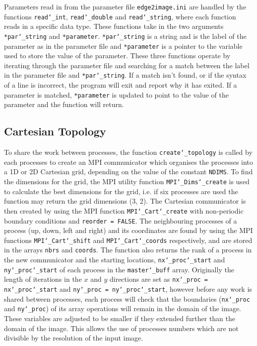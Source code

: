 \documentclass[11pt, a4paper]{article}
\begin{document}
			Parameters read in from the parameter file \texttt{edge2image.ini} are handled by the functions \texttt{read\char`_int}, \texttt{read\char`_double} and \texttt{read\char`_string}, where each function reads in a specific data type. These functions take in the two arguments \texttt{*par\char`_string} and \texttt{*parameter}. \texttt{*par\char`_string} is a string and is the label of the parameter as in the parameter file and \texttt{*parameter} is a pointer to the variable used to store the value of the parameter. These three functions operate by iterating through the parameter file and searching for a match between the label in the parameter file and \texttt{*par\char`_string}. If a match isn't found, or if the syntax of a line is incorrect, the program will exit and report why it has exited. If a parameter is matched, \texttt{*parameter} is updated to point to the value of the parameter and the function will return.
	
		\subsection{Cartesian Topology}
			To share the work between  processes, the function \texttt{create\char`_topology} is called by each processes to create an MPI communicator which organises the processes into a 1D or 2D Cartesian grid, depending on the value of the constant \texttt{NDIMS}. To find the dimensions for the grid, the MPI utility function \texttt{MPI\char`_Dims\char`_create} is used to calculate the best dimensions for the grid, i.e. if six processes are used the function may return the grid dimensions  (3, 2). The Cartesian communicator is then created by using the MPI function \texttt{MPI\char`_Cart\char`_create} with non-periodic boundary conditions and \texttt{reorder = FALSE}. The neighbouring processes of a process (up, down, left and right) and its coordinates are found by using the MPI functions \texttt{MPI\char`_Cart\char`_shift} and \texttt{MPI\char`_Cart\char`_coords} respectively, and are stored in the arrays \texttt{nbrs} and \texttt{coords}. The function also returns the rank of a process in the new communicator and the starting locations, \texttt{nx\char`_proc\char`_start} and \texttt{ny\char`_proc\char`_start} of each process in the \texttt{master\char`_buff} array. Originally the length of iterations in the $x$ and $y$ directions are set as \texttt{nx\char`_proc = nx\char`_proc\char`_start} and \texttt{ny\char`_proc = ny\char`_proc\char`_start}, however before any work is shared between processes, each process will check that the boundaries (\texttt{nx\char`_proc} and \texttt{ny\char`_proc}) of its array operations will remain in the domain of the image. These variables are adjusted to be smaller if they extended further than the domain of the image. This allows the use of processes numbers which are not divisible by the resolution of the input image.
	
\end{document}
